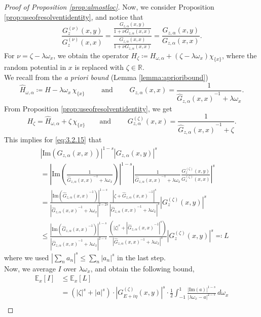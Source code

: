 \documentclass[11pt, a4paper, UKenglish, oneside]{book}
\theoremstyle{plain}
\theoremstyle{remark}
\theoremstyle{definition}
\numberwithin{equation}{section}
\numberwithin{theorem}{section}
\begin{document}
\begin{proof}[Proof of Proposition \ref{prop:almostloc}]
    Now, we consider Proposition \ref{prop:useofresolventidentity}, and notice that 
    \[
        \frac{G_z^{(\nu)}(x,y)}{G_z^{(\nu)}(x,x)} = \frac{\frac{G_{z,\alpha}(x,y)}{1 + \nu G_{z,\alpha}(x,x)}}{\frac{G_{z,\alpha}(x,x)}{1 + \nu G_{z,\alpha}(x,x)}} =\frac{G_{z,\alpha}(x,y)}{G_{z,\alpha}(x,x)}.
    \]
    For $\nu = \zeta -\lambda\omega_x$, we obtain the operator $H_\zeta \coloneqq H_{\omega,\alpha} + (\zeta - \lambda\omega_x)\chi_{\{x\}}$, where the random potential in $x$ is replaced with $\zeta \in \mathbb{R}$.\\
    We recall from   the \textit{a priori bound} (Lemma \ref{lemma:aprioribound}) $$\hat{H}_{\omega,\alpha} \coloneqq H - \lambda\omega_x\,\chi_{\{x\}} \qquad \text{ and }\qquad G_{z,\alpha}(x,x) =\frac{1}{{\hat{G}_{z,\alpha}(x,x)}^{-1} + \lambda\omega_x}.$$
    From Proposition \ref{prop:useofresolventidentity}, we get
    $$ H_\zeta = \hat{H}_{\omega,\alpha} + \zeta\,\chi_{\{x\}} \qquad \text{and } \qquad G_{z,\alpha}^{(\zeta)}(x,x) =\frac{1}{{\hat{G}_{z,\alpha}(x,x)}^{-1} + \zeta}.$$
    This implies for \eqref{eq:3.2.15} that
    \begin{align*}
        &|\mathrm{Im}(G_{z,\alpha}(x,x))|^{1-s}|G_{z,\alpha}(x,y)|^s \\
        &= \left| \mathrm{Im}\left(\frac{1}{{\hat{G}_{z,\alpha}(x,x)}^{-1} + \lambda\omega_x}\right)\right|^{1-s}\left|\frac{1}{{\hat{G}_{z,\alpha}(x,x)}^{-1} + \lambda\omega_x} \frac{G_z^{(\zeta)}(x,y)}{G_z^{(\zeta)}(x,x)}\right|^s\\
        &= \frac{|\mathrm{Im}({\hat{G}_{z,\alpha}(x,x)}^{-1})|^{1-s}}{|{\hat{G}_{z,\alpha}(x,x)}^{-1} + \lambda\omega_x|^{2-2s}} \frac{|\zeta + {\hat{G}_{z,\alpha}(x,x)}^{-1}|^s}{|{\hat{G}_{z,\alpha}(x,x)}^{-1} + \lambda\omega_x|^s} |G_z^{(\zeta)}(x,y)|^s \\
        &\le  \frac{|\mathrm{Im}({\hat{G}_{z,\alpha}(x,x)}^{-1})|^{1-s}}{|{\hat{G}_{z,\alpha}(x,x)}^{-1} + \lambda\omega_x|^{2-s}} \, \frac{(|\zeta|^s + |{\hat{G}_{z,\alpha}(x,x)}^{-1}|^s)}{|\hat{G}_{z,\alpha}(x,x)^{-1} + \lambda\omega_x|^s} |G_z^{(\zeta)}(x,y)|^s \eqcolon L
    \end{align*}
    where we used $ |\sum_n a_n|^s \le \sum_n |a_n|^s$ in the last step.\\
    Now, we average $I$ over $\lambda\omega_x$, and obtain the following bound,
    \begin{align*}
        \mathbb{E}_x [I] &\le \mathbb{E}_x [L] \\
        &= (|\zeta|^s + |a|^s) \cdot |G_{E+i\eta}^{(\zeta)}(x,y)|^s \cdot \frac{1}{2} \int_{-1}^{1} \frac{|\text{Im}(a)|^{1-s}}{| \lambda \omega_x - a|^{2-s}} \, d \omega_x \\

\end{align*}
\end{proof}
\end{document}
